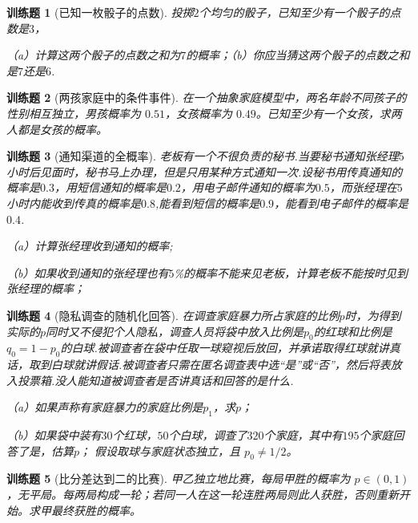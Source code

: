 \documentclass[UTF8,12pt,a4paper,fontset=fandol]{ctexbook}
\newtheorem{exercise}{训练题}[section]
\begin{document}
\begin{exercise}[已知一枚骰子的点数]\label{q:Y2.13}
投掷$2$个均匀的骰子，已知至少有一个骰子的点数是$3$，

（a）计算这两个骰子的点数之和为$7$的概率；（b）你应当猜这两个骰子的点数之和是$7$还是$6$.\par{}\end{exercise}

\begin{exercise}[两孩家庭中的条件事件]\label{q:Y2.15}
在一个抽象家庭模型中，两名年龄不同孩子的性别相互独立，男孩概率为 $0.51$，女孩概率为 $0.49$。已知至少有一个女孩，求两人都是女孩的概率。\par{}\end{exercise}

\begin{exercise}[通知渠道的全概率]\label{q:Y2.16}
老板有一个不很负责的秘书.当要秘书通知张经理$5$小时后见面时，秘书马上办理，但是只用某种方式通知一次.设秘书用传真通知的概率是$0.3$，用短信通知的概率是$0.2$，用电子邮件通知的概率为$0.5$，而张经理在$5$小时内能收到传真的概率是$0.8$,能看到短信的概率是$0.9$，能看到电子邮件的概率是$0.4$.

（a）计算张经理收到通知的概率;

（b）如果收到通知的张经理也有$5$\%的概率不能来见老板，计算老板不能按时见到张经理的概率；\par{}\end{exercise}

\begin{exercise}[隐私调查的随机化回答]\label{q:Y2.17}
在调查家庭暴力所占家庭的比例$p$时，为得到实际的$p$同时又不侵犯个人隐私，调查人员将袋中放入比例是$p_0$的红球和比例是$q_0=1-p_0$的白球.被调查者在袋中任取一球窥视后放回，并承诺取得红球就讲真话，取到白球就讲假话.被调查者只需在匿名调查表中选“是”或“否”，然后将表放入投票箱.没人能知道被调查者是否讲真话和回答的是什么.

（a）如果声称有家庭暴力的家庭比例是$p_1$，求$p$；

（b）如果袋中装有$30$个红球，$50$个白球，调查了$320$个家庭，其中有$195$个家庭回答了是，估算$p$； 假设取球与家庭状态独立，且 $p_0\ne1/2$。\par{}\end{exercise}

\begin{exercise}[比分差达到二的比赛]\label{q:Y2.19}
甲乙独立地比赛，每局甲胜的概率为 $p\in(0,1)$，无平局。每两局构成一轮；若同一人在这一轮连胜两局则此人获胜，否则重新开始。求甲最终获胜的概率。\par{}\end{exercise}
\end{document}

